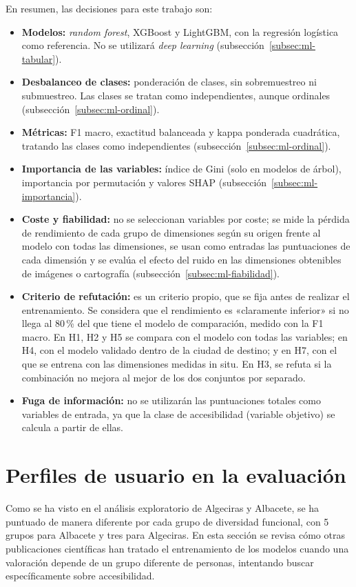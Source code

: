 En resumen, las decisiones para este trabajo son:
\begin{itemize}
  \item \textbf{Modelos:} \textit{random forest}, XGBoost y LightGBM, con la regresión logística como referencia. No se utilizará \textit{deep learning} (subsección~\ref{subsec:ml-tabular}).
  \item \textbf{Desbalanceo de clases:} ponderación de clases, sin sobremuestreo ni submuestreo. Las clases se tratan como independientes, aunque ordinales (subsección~\ref{subsec:ml-ordinal}).
  \item \textbf{Métricas:} F1 macro, exactitud balanceada y kappa ponderada cuadrática, tratando las clases como independientes (subsección~\ref{subsec:ml-ordinal}).
  \item \textbf{Importancia de las variables:} índice de Gini (solo en modelos de árbol), importancia por permutación y valores SHAP (subsección~\ref{subsec:ml-importancia}).
  \item \textbf{Coste y fiabilidad:} no se seleccionan variables por coste; se mide la pérdida de rendimiento de cada grupo de dimensiones según su origen frente al modelo con todas las dimensiones, se usan como entradas las puntuaciones de cada dimensión y se evalúa el efecto del ruido en las dimensiones obtenibles de imágenes o cartografía (subsección~\ref{subsec:ml-fiabilidad}).
  \item \textbf{Criterio de refutación:} es un criterio propio, que se fija antes de realizar el entrenamiento. Se considera que el rendimiento es «claramente inferior» si no llega al 80\,\% del que tiene el modelo de comparación, medido con la F1 macro. En H1, H2 y H5 se compara con el modelo con todas las variables; en H4, con el modelo validado dentro de la ciudad de destino; y en H7, con el que se entrena con las dimensiones medidas in situ. En H3, se refuta si la combinación no mejora al mejor de los dos conjuntos por separado.
  \item \textbf{Fuga de información:} no se utilizarán las puntuaciones totales como variables de entrada, ya que la clase de accesibilidad (variable objetivo) se calcula a partir de ellas.
\end{itemize}

\section{Perfiles de usuario en la evaluación}
\label{sec:perfiles-arte}

Como se ha visto en el análisis exploratorio de Algeciras y Albacete, se ha puntuado de manera diferente por cada grupo de diversidad funcional, con 5 grupos para Albacete y tres para Algeciras. En esta sección se revisa cómo otras publicaciones científicas han tratado el entrenamiento de los modelos cuando una valoración depende de un grupo diferente de personas, intentando buscar específicamente sobre accesibilidad.
\\

